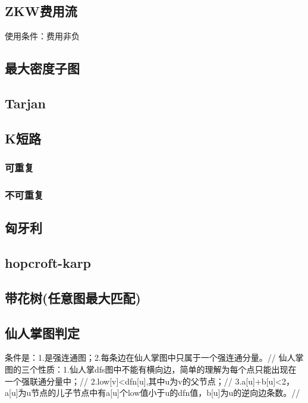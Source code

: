 \documentclass[landscape,a4paper]{article}
\begin{document}
\begin{spacing}{0.3}
\begin{multicols}{2}
		\subsection{ZKW费用流}
		使用条件：费用非负
		
		\subsection{最大密度子图}
		
		\subsection{Tarjan}
		
		
		\subsection{K短路}
	\subsubsection{可重复}
	

	\subsubsection{不可重复}
	
	\subsection{匈牙利}
	
	\subsection{hopcroft-karp}
	
	\subsection{带花树(任意图最大匹配)}
	
	\subsection{仙人掌图判定}
	条件是：1.是强连通图；2.每条边在仙人掌图中只属于一个强连通分量。//
	仙人掌图的三个性质：1.仙人掌dfs图中不能有横向边，简单的理解为每个点只能出现在一个强联通分量中；//
	2.low[v]<dfn[u],其中u为v的父节点；//
	3.a[u]+b[u]<2，a[u]为u节点的儿子节点中有a[u]个low值小于u的dfn值，b[u]为u的逆向边条数。//
	
	

\end{multicols}
\end{spacing}
\end{document}

